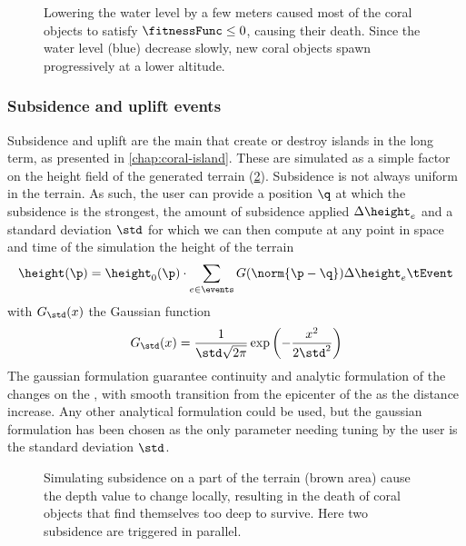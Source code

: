 \begin{figure}
    \caption{Lowering the water level by a few meters caused most of the coral objects to satisfy $\fitnessFunc \leq 0$, causing their death. Since the water level (blue) decrease slowly, new coral objects spawn progressively at a lower altitude.}
    \label{fig:env-obj-water-event}
\end{figure}

\subsubsection{Subsidence and uplift events}
Subsidence and uplift are the main  that create or destroy islands in the long term, as presented in \cref{chap:coral-island}.
These  are simulated as a simple factor on the height field of the generated terrain (\cref{fig:env-obj-subsidence-event}). Subsidence is not always uniform in the terrain. As such, the user can provide a position $\q$ at which the subsidence is the strongest, the amount of subsidence applied $\Delta \height_e$ and a standard deviation $\std$ for which we can then compute at any point in space and time of the simulation the height of the terrain
\begin{align*}
    \height(\p) = \height_0(\p) \cdot \sum_{e \in \events}{G(\norm{\p - \q})} \Delta \height_e \tEvent 
\end{align*}
with $G_{\std}(x)$ the Gaussian function
\begin{align}
    G_{\std}(x) = \frac{1}{\std \sqrt{2\pi}} \exp \left(-\frac {x^{2}}{2 \std ^{2}}\right)
\end{align}
The gaussian formulation guarantee continuity and analytic formulation of the changes on the , with smooth transition from the epicenter of the  as the distance increase. Any other analytical formulation could be used, but the gaussian formulation has been chosen as the only parameter needing tuning by the user is the standard deviation $\std$.

\begin{figure}
    \caption{Simulating subsidence on a part of the terrain (brown area) cause the depth value to change locally, resulting in the death of coral objects that find themselves too deep to survive. Here two subsidence  are triggered in parallel. }
    \label{fig:env-obj-subsidence-event}
\end{figure}

